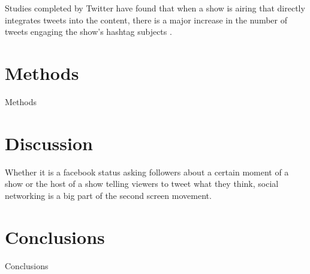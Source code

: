 \documentclass[11pt, oneside]{article}
\begin{document}
Studies completed by Twitter have found that when a show is airing that directly integrates tweets into the content, there is a major increase in the number of tweets engaging the show's hashtag subjects \cite{TwitterTV}. 

\section{Methods}
Methods

\section{Discussion}
Whether it is a facebook status asking followers about a certain moment of a show or the host of a show telling viewers to tweet what they think, social networking is a big part of the second screen movement. 

\section{Conclusions}
Conclusions

{}

\end{document}
